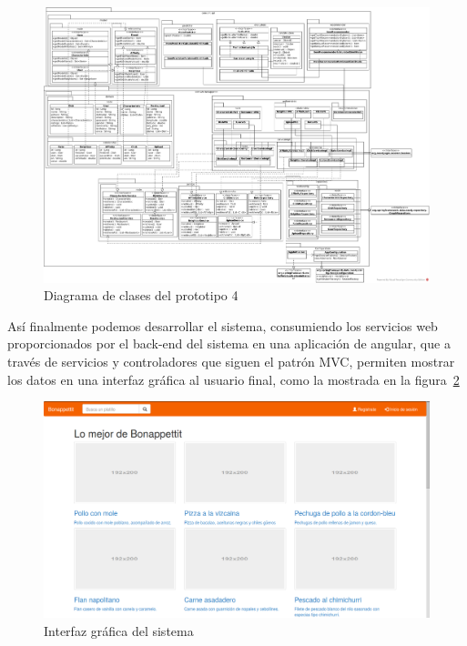    \begin{landscape}
      \begin{figure}[h!]
        \centering
        \includegraphics[width=25cm]{./images/monster_class}
        \caption{Diagrama de clases del prototipo 4}
        \label{fig:monster_classes}
      \end{figure}
    \end{landscape}

    Así finalmente podemos desarrollar el sistema, consumiendo los servicios web proporcionados por el back-end del sistema en una aplicación de angular, que a través de servicios y controladores que siguen el patrón MVC, permiten mostrar los datos en una interfaz gráfica al usuario final, como la mostrada en la figura~\ref{fig:final_bonappettit}


      \begin{figure}[h!]
        \centering
        \includegraphics[width=16cm]{./images/p4_bonappettit}
        \caption{Interfaz gráfica del sistema}
        \label{fig:final_bonappettit}
      \end{figure}

